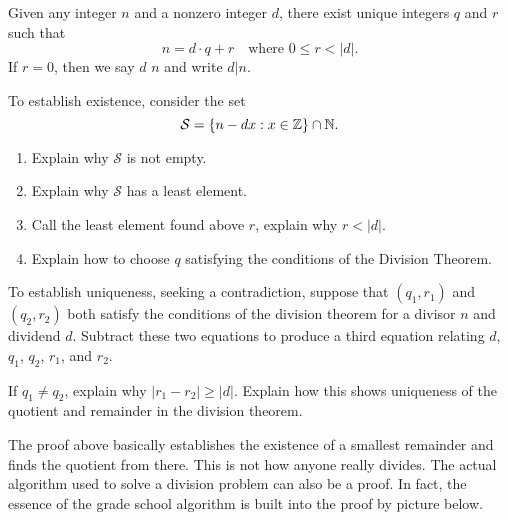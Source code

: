 \documentclass{ximera}
\begin{document}
\begin{theorem}
  Given any integer $n$ and a nonzero integer $d$, there exist unique
  integers $q$ and $r$ such that
  \[
  n = d\cdot q+r\quad\text{where $0\le r< |d|$.}
  \]
  If $r=0$, then we say $d$  $n$ and write $d|n$.
  \begin{sketch}
    To establish existence, consider the set
    \[
    \mathcal{S} = \{n -  dx : x\in \mathbb Z\}\cap \mathbb N.
    \]
    \begin{enumerate}
    \item Explain why $\mathcal S$ is not empty.
    \item Explain why $\mathcal S$ has a least element.
    \item Call the least element found above $r$, explain why $r < |d|$.
    \item Explain how to choose $q$ satisfying the conditions of the
      Division Theorem.
    \end{enumerate}
    
    To establish uniqueness, seeking a contradiction, suppose that
    $(q_1,r_1)$ and $(q_2,r_2)$ both satisfy the conditions of the
    division theorem for a divisor $n$ and dividend $d$. Subtract
    these two equations to produce a third equation relating $d$,
    $q_1$, $q_2$, $r_1$, and $r_2$.


    If $q_1 \ne q_2$, explain why $|r_1 - r_2| \ge |d|$.  Explain how
    this shows uniqueness of the quotient and remainder in the
    division theorem.
  \end{sketch}
\end{theorem}


The proof above basically establishes the existence of a smallest
remainder and finds the quotient from there. This is not how anyone
really divides.  The actual algorithm used to solve a division problem
can also be a proof. In fact, the essence of the grade school
algorithm is built into the proof by picture below.
\end{document}
